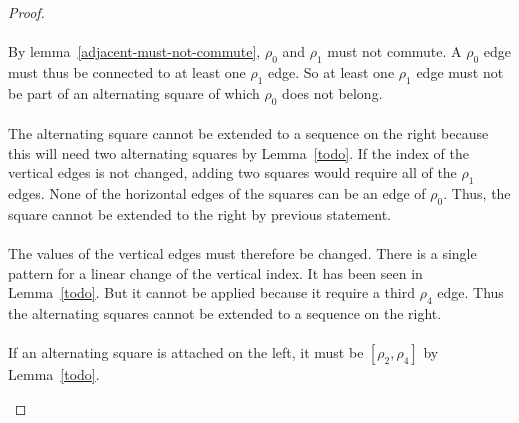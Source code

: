 \begin{proof}
\begin{figure}[H]
\begin{center}
\begin{tikzpicture}[scale=.8]
    \end{tikzpicture}
    \caption{}
  \end{center}
\end{figure}

\paragraph{}
By lemma~\ref{adjacent-must-not-commute}, $\rho_0$ and $\rho_1$ must not commute. A $\rho_0$ edge must thus be connected to at least one $\rho_1$ edge. So at least one $\rho_1$ edge must not be part of an alternating square of which $\rho_0$ does not belong.

\paragraph{}
The alternating square cannot be extended to a sequence on the right because this will need two alternating squares by Lemma~\ref{todo}. If the index of the vertical edges is not changed, adding two squares would require all of the $\rho_1$ edges. None of the horizontal edges of the squares can be an edge of $\rho_0$. Thus, the square cannot be extended to the right by previous statement.

\paragraph{}
The values of the vertical edges must therefore be changed. There is a single pattern for a linear change of the vertical index. It has been seen in Lemma~\ref{todo}. But it cannot be applied because it require a third $\rho_4$ edge. Thus the alternating squares cannot be extended to a sequence on the right.

\paragraph{}
If an alternating square is attached on the left, it must be $[\rho_2, \rho_4]$ by Lemma~\ref{todo}.

\begin{figure}[H]
  \begin{center}
\end{center}
\end{figure}
\end{proof}
